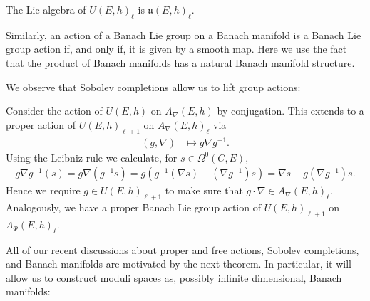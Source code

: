 \documentclass[12pt]{ociamthesis}  %
\begin{document}
\begin{example}
  The Lie algebra of $U(E,h)_\ell$ is $\mathfrak u(E,h)_\ell$.
\end{example}

Similarly, an action of a Banach Lie group on a Banach manifold
is a Banach Lie group action if, and only if, it is given by a
smooth map. Here we use the fact that the product of Banach manifolds
has a natural Banach manifold structure.

We observe that Sobolev completions allow us to lift group
actions:

\begin{example}
  Consider the action of $U(E,h)$ on $A_\nabla(E,h)$
  by conjugation. This extends to a proper action of $U(E,h)_{\ell+1}$
  on $A_\nabla(E,h)_\ell$ via
  \begin{align*}
    (g,\nabla) & \mapsto g\nabla g^{-1}.
  \end{align*}
  Using the Leibniz rule we calculate, for $s\in\Omega^0(C,E)$,
  \begin{align*}
    g\nabla g^{-1}(s) = g\nabla(g^{-1}s) = g(g^{-1}(\nabla s) + (\nabla g^{-1})s)
    = \nabla s + g(\nabla g^{-1})s.
  \end{align*}
  Hence we require $g\in U(E,h)_{\ell + 1}$ to make sure that $g\cdot\nabla\in A_\nabla(E,h)_\ell$.
  Analogously, we have a proper Banach Lie group action of $U(E,h)_{\ell+1}$
  on $A_\Phi (E,h)_\ell$.
\end{example}

All of our recent discussions about proper and free actions, Sobolev
completions, and Banach manifolds are motivated by the next theorem.
In particular, it will allow us to construct moduli spaces as, possibly
infinite dimensional, Banach manifolds:
\end{document}
